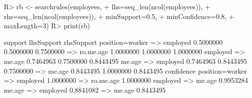 \begin{Schunk}
% --begin: "searchrules"
\begin{Sinput}
R> rb <- searchrules(employees,
+                    lhs=seq_len(ncol(employees)),
+                    rhs=seq_len(ncol(employees)),
+                    minSupport=0.5,
+                    minConfidence=0.8,
+                    maxLength=3)
R> print(rb)
\end{Sinput}
\begin{Soutput}
                              support lhsSupport rhsSupport
position=worker => employed 0.5000000  0.5000000  0.7500000
 => ro.me.age               1.0000000  1.0000000  1.0000000
employed => me.age          0.7464963  0.7500000  0.8443495
me.age => employed          0.7464963  0.8443495  0.7500000
 => me.age                  0.8443495  1.0000000  0.8443495
                            confidence
position=worker => employed  1.0000000
 => ro.me.age                1.0000000
employed => me.age           0.9953284
me.age => employed           0.8841082
 => me.age                   0.8443495
\end{Soutput}
%
% --end: "searchrules"
\end{Schunk}

